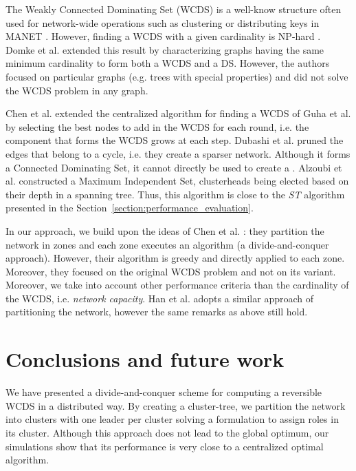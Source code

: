 \documentclass[twoside]{article}
\begin{document}
The Weakly Connected Dominating Set (WCDS) is a well-know structure
often used for network-wide operations such as clustering or
distributing keys in MANET \cite{pathan06}. However, finding a WCDS
with a given cardinality is NP-hard \cite{dunbar97}. Domke et
al. \cite{domke05} extended this result by characterizing graphs
having the same minimum cardinality to form both a WCDS and a
DS. However, the authors focused on particular graphs (e.g. trees with special properties) and did not solve the WCDS problem in any graph. 

Chen et al. \cite{chen02} extended the centralized algorithm for
finding a WCDS of Guha
et al. \cite{guha98} by selecting the best nodes to add in the WCDS
for each round, i.e. the component that forms the WCDS grows at each
step. Dubashi et al. \cite{dubashi05} pruned the edges that belong to
a cycle, i.e. they create a sparser network. Although it forms a
Connected Dominating Set, it cannot directly be used to create a
\rwcds. Alzoubi et al. \cite{alzoubi03} constructed a Maximum
Independent Set, clusterheads being elected based on their depth in a
spanning tree. Thus, this algorithm is close to the \emph{ST}
algorithm presented in the
Section~\ref{section:performance_evaluation}.

In our approach, we build upon the ideas of Chen et al. \cite{chen04}:
they partition the network in zones and each zone executes an
algorithm (a divide-and-conquer approach). However, their algorithm is
greedy and directly applied to each zone. Moreover, they focused on
the original WCDS problem and not on its \rwcds variant. Moreover, we
take into account other performance criteria than the cardinality of
the WCDS, i.e. \emph{network capacity}. Han et al. \cite{han07} adopts
a similar approach of partitioning the network, however the same
remarks as above still hold.



\section{Conclusions and future work}
\label{section:conclusion}

We have presented a divide-and-conquer scheme for computing a
reversible WCDS in a distributed way. By creating a cluster-tree, we
partition the network into clusters with one leader per cluster
solving a \milp formulation to assign roles in its cluster. Although
this approach does not lead to the global optimum, our simulations
show that its performance is very close to a centralized optimal
algorithm.
\end{document}
